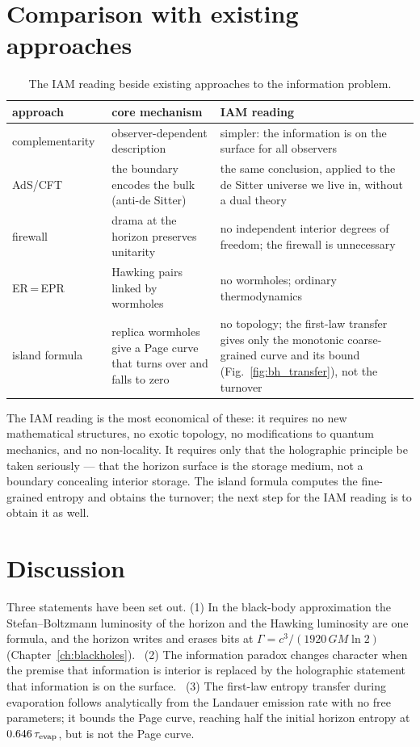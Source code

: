 \section{Comparison with existing approaches}\label{sec:bi_compare}
\begin{table}[htbp]\centering\small
\caption{The IAM reading beside existing approaches to the information problem. \interp}\label{tab:bi_compare}
\begin{tabularx}{\textwidth}{@{}>{\raggedright\arraybackslash}p{}>{\raggedright\arraybackslash}X>{\raggedright\arraybackslash}X@{}}\toprule
approach & core mechanism & IAM reading\\\midrule
complementarity~\cite{SusskindThorlaciusUglum1993} & observer-dependent description & simpler: the information is on the surface for all observers\\
AdS/CFT~\cite{Maldacena1998} & the boundary encodes the bulk (anti-de Sitter) & the same conclusion, applied to the de Sitter universe we live in, without a dual theory\\
firewall~\cite{AMPS2013} & drama at the horizon preserves unitarity & no independent interior degrees of freedom; the firewall is unnecessary\\
ER\,=\,EPR~\cite{MaldacenaSusskind2013} & Hawking pairs linked by wormholes & no wormholes; ordinary thermodynamics\\
island formula~\cite{Penington2020,Almheiri2020} & replica wormholes give a Page curve that turns over and falls to zero & no topology; the first-law transfer gives only the monotonic coarse-grained curve and its bound (Fig.~\ref{fig:bh_transfer}), not the turnover\\\bottomrule
\end{tabularx}
\end{table}
The IAM reading is the most economical of these: it requires no new mathematical structures, no exotic topology, no modifications to quantum mechanics, and
no non-locality. It requires only that the holographic principle be taken seriously --- that the horizon surface is the storage medium, not a boundary
concealing interior storage. The island formula computes the fine-grained entropy and obtains the turnover; the next step for the IAM
reading is to obtain it as well. \interp

\section{Discussion}\label{sec:bi_discussion}
Three statements have been set out. (1) In the black-body approximation the Stefan--Boltzmann luminosity of the horizon and the Hawking luminosity are one
formula, and the horizon writes and erases bits at $\Gamma=c^3/(1920\,GM\ln2)$ (Chapter~\ref{ch:blackholes}). \derived\ (2) The information paradox changes character when the
premise that information is interior is replaced by the holographic statement that information is on the surface. \interp\ (3) The first-law entropy
transfer during evaporation follows analytically from the Landauer emission rate with no free parameters; it bounds the Page curve, reaching half the
initial horizon entropy at $0.646\,\tau_{\rm evap}$, but is not the Page curve. \derived

